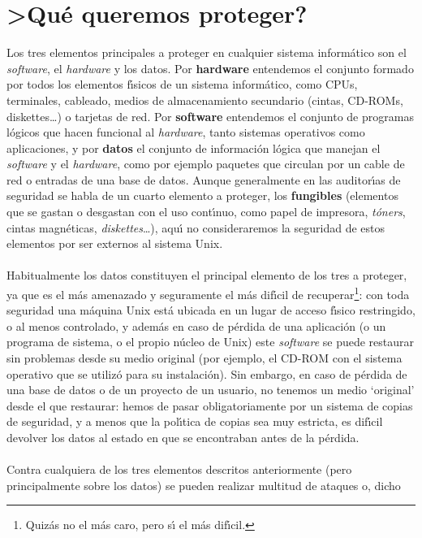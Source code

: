 \section{>Qu\'e queremos proteger?}
Los tres elementos principales a proteger en cualquier sistema inform\'atico son
el {\it software}, el {\it hardware} y los datos. Por {\bf hardware} entendemos
el conjunto formado por todos los elementos f\'{\i}sicos de un sistema 
inform\'atico, como CPUs, terminales, cableado, medios de almacenamiento 
secundario (cintas, CD-ROMs, diskettes\ldots) o tarjetas de red. Por {\bf 
software} entendemos el conjunto de programas l\'ogicos que hacen funcional al 
{\it hardware}, tanto sistemas operativos como aplicaciones, y por {\bf datos}
el conjunto de informaci\'on l\'ogica que manejan el {\it software} y el {\it
hardware}, como por ejemplo paquetes que circulan por un cable de red o entradas
de una base de datos. Aunque generalmente en las auditor\'{\i}as de seguridad
se habla de un cuarto elemento a proteger, los {\bf fungibles} (elementos que
se gastan o desgastan con el uso cont\'{\i}nuo, como papel de impresora, {\it 
t\'oners}, cintas magn\'eticas, {\it diskettes}\ldots), aqu\'{\i} no 
consideraremos la seguridad de estos elementos por ser externos al sistema 
Unix.\\
\\Habitualmente los datos constituyen el principal elemento de los tres a 
proteger, ya que es el m\'as amenazado y seguramente el m\'as dif\'{\i}cil de 
recuperar\footnote{Quiz\'as no el m\'as caro, pero s\'{\i} el m\'as 
dif\'{\i}cil.}: 
con toda seguridad una m\'aquina Unix est\'a ubicada en un lugar de 
acceso f\'{\i}sico restringido, o al menos controlado, y adem\'as en caso de
p\'erdida de una aplicaci\'on (o un programa de sistema, o el propio n\'ucleo
de Unix) este {\it software} se puede restaurar sin problemas desde su medio
original (por ejemplo, el CD-ROM con el sistema operativo que se utiliz\'o para
su instalaci\'on). Sin embargo, en caso de p\'erdida de una base de datos o de
un proyecto de un usuario, no tenemos un medio `original' desde el que 
restaurar: hemos de pasar obligatoriamente por un sistema de copias de 
seguridad, y a menos que la pol\'{\i}tica de copias sea muy estricta, es 
dif\'{\i}cil devolver los datos al estado en que se encontraban antes de la 
p\'erdida.\\
\\Contra cualquiera de los tres elementos descritos anteriormente (pero 
principalmente sobre los datos) se pueden realizar multitud de ataques o, dicho
